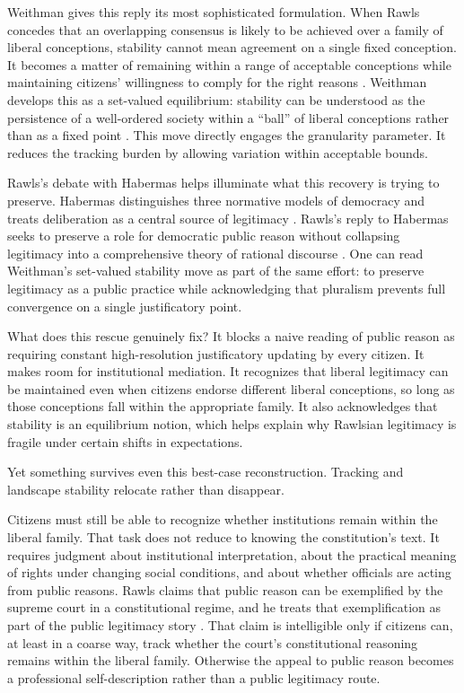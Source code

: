 \documentclass[12pt]{article}
\begin{document}
Weithman gives this reply its most sophisticated formulation. When Rawls concedes that an overlapping consensus is likely to be achieved over a family of liberal conceptions, stability cannot mean agreement on a single fixed conception. It becomes a matter of remaining within a range of acceptable conceptions while maintaining citizens' willingness to comply for the right reasons \parencite[p.~198]{Weithman2023FixedPoints}. Weithman develops this as a set-valued equilibrium: stability can be understood as the persistence of a well-ordered society within a \enquote{ball} of liberal conceptions rather than as a fixed point \parencite[p.~206]{Weithman2023FixedPoints}. This move directly engages the granularity parameter. It reduces the tracking burden by allowing variation within acceptable bounds.

Rawls's debate with Habermas helps illuminate what this recovery is trying to preserve. Habermas distinguishes three normative models of democracy and treats deliberation as a central source of legitimacy \parencite[p.~3]{habermas1994three}. Rawls's reply to Habermas seeks to preserve a role for democratic public reason without collapsing legitimacy into a comprehensive theory of rational discourse \parencite[p.~134]{rawls1995reply}. One can read Weithman's set-valued stability move as part of the same effort: to preserve legitimacy as a public practice while acknowledging that pluralism prevents full convergence on a single justificatory point.

What does this rescue genuinely fix? It blocks a naive reading of public reason as requiring constant high-resolution justificatory updating by every citizen. It makes room for institutional mediation. It recognizes that liberal legitimacy can be maintained even when citizens endorse different liberal conceptions, so long as those conceptions fall within the appropriate family. It also acknowledges that stability is an equilibrium notion, which helps explain why Rawlsian legitimacy is fragile under certain shifts in expectations.

Yet something survives even this best-case reconstruction. Tracking and landscape stability relocate rather than disappear.

Citizens must still be able to recognize whether institutions remain within the liberal family. That task does not reduce to knowing the constitution's text. It requires judgment about institutional interpretation, about the practical meaning of rights under changing social conditions, and about whether officials are acting from public reasons. Rawls claims that public reason can be exemplified by the supreme court in a constitutional regime, and he treats that exemplification as part of the public legitimacy story \parencite[p.~133]{rawls1995reply}. That claim is intelligible only if citizens can, at least in a coarse way, track whether the court's constitutional reasoning remains within the liberal family. Otherwise the appeal to public reason becomes a professional self-description rather than a public legitimacy route.
\end{document}
